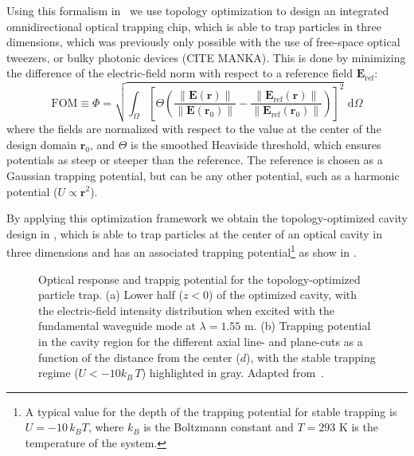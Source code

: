 Using this formalism in~\cite{ownpub1} we use topology optimization to design an integrated omnidirectional optical trapping chip, which is able to trap particles in three dimensions,
which was previously only possible with the use of free-space optical tweezers, or bulky photonic devices (CITE MANKA). This is done by minimizing 
the difference of the electric-field norm with respect to a reference field $\mathbf{E}_\text{ref}$:
\begin{equation}
    \text{FOM} \equiv \Phi=\sqrt{\int_{\Omega}\left[\Theta\left(\frac{\|\mathbf{E}(\mathbf{r})\|}{\left\|\mathbf{E}\left(\mathbf{r}_0\right)\right\|}-\frac{\left\|\mathbf{E}_{\text{ref}}(\mathbf{r})\right\|}{\left\|\mathbf{E}_{\text{ref}}\left(\mathbf{r}_0\right)\right\|}\right)\right]^2} \text{~d} \Omega
    \end{equation}
where the fields are normalized with respect to the value at the center of the design domain $\mathbf{r}_0$, and $\Theta$ is the smoothed Heaviside threshold, which ensures
potentials as steep or steeper than the reference. The reference is chosen as a Gaussian trapping potential, but can be any other potential, such as a harmonic potential ($U\propto\mathbf{r}^2$).

By applying this optimization framework we obtain the topology-optimized cavity design in , which is able to trap particles at the center of an optical
cavity in three dimensions and has an associated trapping potential\footnote{A typical value for the depth of the trapping potential for stable trapping is $U=-10\, k_B T$, where
 $ k_B$ is the Boltzmann constant and $T=293$ K is the temperature of the system.} as show in .

\begin{figure}[tb]
    \centering
    \caption{Optical response and trappig potential for the topology-optimized particle trap. (a) Lower half ($z<0$) of the optimized cavity, with the electric-field intensity
    distribution when excited with the fundamental waveguide mode at $\lambda=1.55$ \textmu m. (b) Trapping potential in the cavity region for the different axial line- and plane-cuts as a function
    of the distance from the center ($d$), with the stable trapping regime ($U<-10 k_B\, T$) highlighted in gray. Adapted from~\cite{ownpub1}.}
    \label{fig:MST_dipole}
\end{figure}

